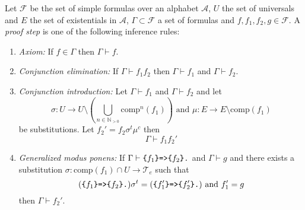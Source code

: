 \begin{definition}\label{proofsteps}
Let $\mathcal{F}$ be the set of simple formulas over an \nthree alphabet $\mathcal{A}$, $U$ the set of universals and $E$ the set of existentials in $\mathcal{A}$,  $\Gamma\subset \mathcal{F}$ a set of formulas and
$f,f_1,f_2, g\in \mathcal{F}$. 
A \textit{proof step} is one of the following inference rules:
\begin{enumerate}
 \item \emph{Axiom:} If $f \in \Gamma$ then $\Gamma \vdash f$.%
 \item \emph{Conjunction elimination:} If $\Gamma \vdash f_1f_2$ then $\Gamma \vdash f_1$ and $\Gamma \vdash f_2$.
 \item \emph{Conjunction introduction:} Let $\Gamma\vdash f_1$ and $\Gamma \vdash f_2$ and 
 let \[\sigma: U\rightarrow U\setminus (\bigcup_{n\in \mathbb{N}_{>0}}\text{comp}^n(f_1) )  %
 \text{ and } %
 \mu:E\rightarrow E\setminus \text{comp}(f_1)\] be substitutions. Let $f_2'= f_2\sigma^t\mu^c$ 
then \[\Gamma \vdash f_1f_2'\]
 \item \emph{Generalized modus ponens:} If $\Gamma \vdash \verb!{!f_1\verb!}=>{!f_2\verb!}.!$ and $\Gamma \vdash g$ %
 and there exists a substitution $\sigma:\text{comp}(f_1)\cap U \rightarrow \mathcal{T}_e$ such that 
 \[
  (\verb!{!f_1\verb!}=>{!f_2\verb!}.!)\sigma^t= (\verb!{!f_1'\verb!}=>{!f_2'\verb!}.!)\text{ and }
 f'_1=g\] 
then $\Gamma \vdash f_2'$.
 \end{enumerate}
\end{definition}

